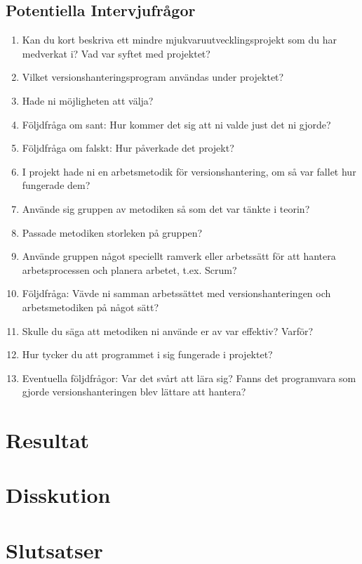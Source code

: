 \subsection{ Potentiella Intervjufrågor } \vspace{1em}
\begin{enumerate}
  \item Kan du kort beskriva ett mindre mjukvaruutvecklingsprojekt som du har medverkat i? Vad var syftet med projektet?

  \item Vilket versionshanteringsprogram användas under projektet?

  \item Hade ni möjligheten att välja?

  \item Följdfråga om sant: Hur kommer det sig att ni valde just det ni gjorde?
  \item Följdfråga om falskt: Hur påverkade det projekt?

  \item I projekt hade ni en arbetsmetodik för versionshantering, om så var fallet hur fungerade dem?

  \item Använde sig gruppen av metodiken så som det var tänkte i teorin?

  \item Passade metodiken storleken på gruppen?

  \item Använde gruppen något speciellt ramverk eller arbetssätt för att hantera arbetsprocessen och planera arbetet, t.ex. Scrum?

  \item Följdfråga: Vävde ni samman arbetssättet med versionshanteringen och arbetsmetodiken på något sätt?

  \item Skulle du säga att metodiken ni använde er av var effektiv? Varför?

  \item Hur tycker du att programmet i sig fungerade i projektet?
  \item Eventuella följdfrågor: Var det svårt att lära sig? Fanns det programvara som gjorde versionshanteringen blev lättare att hantera?

\end{enumerate}




\vspace{1.5em}
\section{Resultat}


\vspace{1.5em}
\section{Disskution}


\vspace{1.5em}
\section{Slutsatser}
